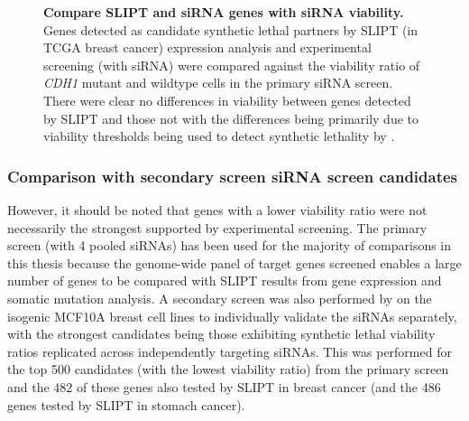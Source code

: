 \begin{figure}[!htp]
\begin{mdframed}
\begin{center}
   \end{center}
   \caption[Compare SLIPT and siRNA genes with siRNA viability]{\small \textbf{Compare SLIPT and siRNA genes with siRNA viability.} Genes detected as candidate synthetic lethal partners by SLIPT (in TCGA breast cancer) expression analysis and experimental screening (with siRNA) were compared against the viability ratio of \textit{CDH1} mutant and wildtype cells in the primary siRNA screen. There were clear no differences in viability between genes detected by SLIPT and those not with the differences being primarily due to viability thresholds being used to detect synthetic lethality by \citet{Telford2015}. 
}
\label{fig:compare_viability_SL}
\end{mdframed}
\end{figure}

\FloatBarrier

\subsubsection{Comparison with secondary screen siRNA screen candidates}

However, it should be noted that genes with a lower viability ratio were not necessarily the strongest supported by experimental screening. The primary screen (with 4 pooled siRNAs) has been used for the majority of comparisons in this thesis because the genome-wide panel of target genes screened enables a large number of genes to be compared with SLIPT results from gene expression and somatic mutation analysis. A secondary screen was also performed by \citet{Telford2015} on the isogenic MCF10A breast cell lines to individually validate the siRNAs separately, with the strongest candidates being those exhibiting synthetic lethal viability ratios replicated across independently targeting siRNAs. This was performed for the top 500 candidates (with the lowest viability ratio) from the primary screen and the 482 of these genes also tested by SLIPT in breast cancer (and the 486 genes tested by SLIPT in stomach cancer).

